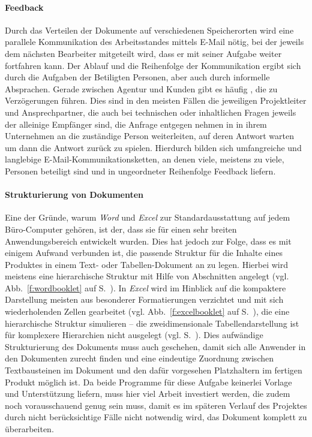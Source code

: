 \paragraph{Feedback} Durch das Verteilen der Dokumente auf verschiedenen Speicherorten wird eine parallele Kommunikation des Arbeitsstandes mittels E-Mail nötig, bei der jeweils dem nächsten Bearbeiter mitgeteilt wird, dass er mit seiner Aufgabe weiter fortfahren kann. Der Ablauf und die Reihenfolge der Kommunikation ergibt sich durch die Aufgaben der Betiligten Personen, aber auch durch informelle Absprachen. Gerade zwischen Agentur und Kunden gibt es häufig , die zu Verzögerungen führen. Dies sind in den meisten Fällen die jeweiligen Projektleiter und Ansprechpartner, die auch bei technischen oder inhaltlichen Fragen jeweils der alleinige Empfänger sind, die Anfrage entgegen nehmen in in ihrem Unternehmen an die zuständige Person weiterleiten, auf deren Antwort warten um dann die Antwort zurück zu spielen. Hierdurch bilden sich umfangreiche und langlebige E-Mail-Kommunikationsketten, an denen viele, meistens zu viele, Personen beteiligt sind und in ungeordneter Reihenfolge Feedback liefern.

\paragraph{Strukturierung von Dokumenten} Eine der Gründe, warum \emph{Word} und \emph{Excel} zur Standardausstattung auf jedem Büro-Computer gehören, ist der, dass sie für einen sehr breiten Anwendungsbereich entwickelt wurden. Dies hat jedoch zur Folge, dass es mit einigem Aufwand verbunden ist, die passende Struktur für die Inhalte eines Produktes in einem Text- oder Tabellen-Dokument an zu legen. Hierbei wird meistens eine hierarchische Struktur mit Hilfe von Abschnitten angelegt (vgl. Abb.~\ref{f:wordbooklet} auf S.~\pageref{f:wordbooklet}). In \emph{Excel} wird im Hinblick auf die kompaktere Darstellung meisten aus besonderer Formatierungen verzichtet und mit sich wiederholenden Zellen gearbeitet (vgl. Abb.~\ref{f:excelbooklet} auf S.~\pageref{f:excelbooklet}), die eine hierarchische Struktur simulieren -- die zweidimensionale Tabellendarstellung ist für komplexere Hierarchien nicht ausgelegt (vgl. S.~\pageref{l:hierarchien}). Dies aufwändige Strukturierung des Dokuments muss auch geschehen, damit sich alle Anwender in den Dokumenten zurecht finden und eine eindeutige Zuordnung zwischen Textbausteinen im Dokument und den dafür vorgesehen Platzhaltern im fertigen Produkt möglich ist. Da beide Programme für diese Aufgabe keinerlei Vorlage und Unterstützung liefern, muss hier viel Arbeit investiert werden, die zudem noch vorausschauend genug sein muss, damit es im späteren Verlauf des Projektes durch nicht berücksichtige Fälle nicht notwendig wird, das Dokument komplett zu überarbeiten.

